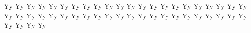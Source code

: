 \documentclass{worksheet}
\begin{document}
\begin{drillsheet}
\calligra
Yy Yy Yy Yy Yy Yy Yy Yy Yy Yy Yy Yy Yy Yy Yy Yy Yy Yy Yy Yy Yy Yy Yy Yy Yy Yy Yy Yy Yy Yy Yy Yy Yy Yy Yy Yy Yy Yy Yy Yy Yy Yy Yy Yy Yy Yy Yy Yy
\end{drillsheet}
\end{document}
